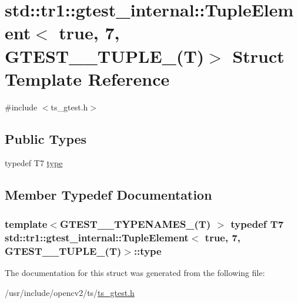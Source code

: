 \hypertarget{structstd_1_1tr1_1_1gtest__internal_1_1TupleElement_3_01true_00_017_00_01GTEST__10__TUPLE___07T_08_4}{\section{std\-:\-:tr1\-:\-:gtest\-\_\-internal\-:\-:Tuple\-Element$<$ true, 7, G\-T\-E\-S\-T\-\_\-\_\-\-T\-U\-P\-L\-E\-\_\-(T)$>$ Struct Template Reference}
\label{structstd_1_1tr1_1_1gtest__internal_1_1TupleElement_3_01true_00_017_00_01GTEST__10__TUPLE___07T_08_4}
}


{\ttfamily \#include $<$ts\-\_\-gtest.\-h$>$}

\subsection*{Public Types}
\begin{DoxyCompactItemize}
\item 
typedef T7 \hyperlink{structstd_1_1tr1_1_1gtest__internal_1_1TupleElement_3_01true_00_017_00_01GTEST__10__TUPLE___07T_08_4_aad3f6eafe360b9aa9ef2d97f68edcc66}{type}
\end{DoxyCompactItemize}


\subsection{Member Typedef Documentation}
\hypertarget{structstd_1_1tr1_1_1gtest__internal_1_1TupleElement_3_01true_00_017_00_01GTEST__10__TUPLE___07T_08_4_aad3f6eafe360b9aa9ef2d97f68edcc66}{
\subsubsection[{type}]{\setlength{\rightskip}{0pt plus 5cm}template$<$G\-T\-E\-S\-T\-\_\-\_\-\-T\-Y\-P\-E\-N\-A\-M\-E\-S\-\_\-(\-T) $>$ typedef T7 {\bf std\-::tr1\-::gtest\-\_\-internal\-::\-Tuple\-Element}$<$ true, 7, {\bf G\-T\-E\-S\-T\-\_\-\_\-\-T\-U\-P\-L\-E\-\_\-}({\bf T})$>$\-::{\bf type}}}\label{structstd_1_1tr1_1_1gtest__internal_1_1TupleElement_3_01true_00_017_00_01GTEST__10__TUPLE___07T_08_4_aad3f6eafe360b9aa9ef2d97f68edcc66}


The documentation for this struct was generated from the following file\-:\begin{DoxyCompactItemize}
\item 
/usr/include/opencv2/ts/\hyperlink{ts__gtest_8h}{ts\-\_\-gtest.\-h}\end{DoxyCompactItemize}

